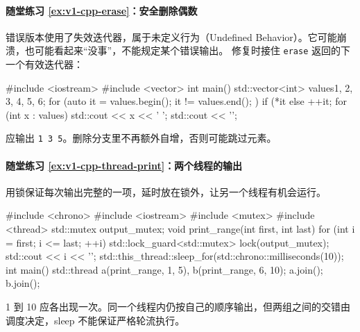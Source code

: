 \paragraph*{随堂练习 \ref{ex:v1-cpp-erase}：安全删除偶数}
\begin{solution}
错误版本使用了失效迭代器，属于未定义行为（Undefined Behavior）。它可能崩溃，也可能看起来“没事”，不能规定某个错误输出。
修复时接住 \texttt{erase} 返回的下一个有效迭代器：
\begin{tcpp}
#include <iostream>
#include <vector>
int main() {
    std::vector<int> values{1, 2, 3, 4, 5, 6};
    for (auto it = values.begin(); it != values.end(); ) {
        if (*it %
        else ++it;
    }
    for (int x : values) std::cout << x << ' ';
    std::cout << '\n';
}
\end{tcpp}
应输出 \texttt{1 3 5}。删除分支里不再额外自增，否则可能跳过元素。
\end{solution}

\paragraph*{随堂练习 \ref{ex:v1-cpp-thread-print}：两个线程的输出}
\begin{solution}
用锁保证每次输出完整的一项，延时放在锁外，让另一个线程有机会运行。
\begin{tcpp}
#include <chrono>
#include <iostream>
#include <mutex>
#include <thread>
std::mutex output_mutex;
void print_range(int first, int last) {
    for (int i = first; i <= last; ++i) {
        {
            std::lock_guard<std::mutex> lock(output_mutex);
            std::cout << i << '\n';
        }
        std::this_thread::sleep_for(std::chrono::milliseconds(10));
    }
}
int main() {
    std::thread a(print_range, 1, 5), b(print_range, 6, 10);
    a.join();
    b.join();
}
\end{tcpp}
1 到 10 应各出现一次。同一个线程内仍按自己的顺序输出，但两组之间的交错由调度决定，sleep 不能保证严格轮流执行。
\end{solution}

